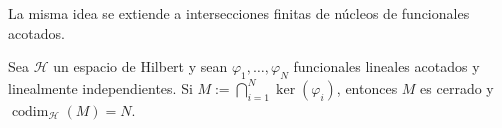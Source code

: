 La misma idea se extiende a intersecciones finitas de núcleos de funcionales acotados.

\begin{prop}\label{prop:finite-codim-hilbert-kernels}
	Sea $\mathcal H$ un espacio de Hilbert y sean $\varphi_1,\dots,\varphi_N$ funcionales lineales acotados y linealmente independientes. Si $M:=\bigcap_{i=1}^N \ker(\varphi_i)$, entonces $M$ es cerrado y $\operatorname{codim}_{\mathcal H}(M)=N$.
\end{prop}

